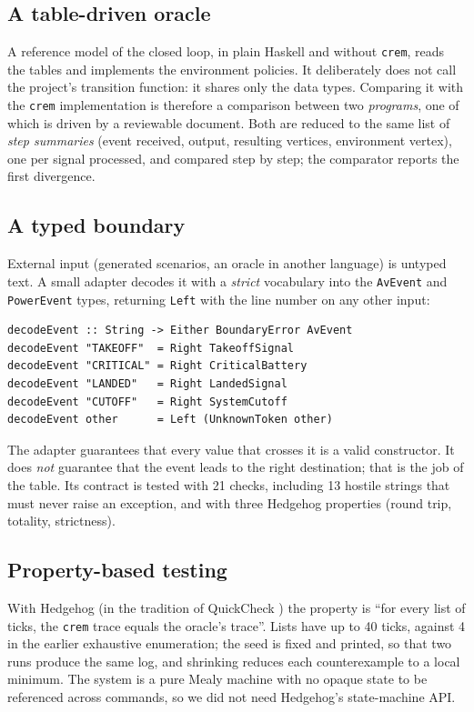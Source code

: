 \documentclass[review]{jfp-epi}
\newcommand{\crem}{\texttt{crem}}
\newcommand{\code}[1]{\texttt{#1}}
\begin{document}
\subsection{A table-driven oracle}

A reference model of the closed loop, in plain Haskell and without \crem{}, reads the tables and implements the environment policies. It deliberately does not call the project's transition function: it shares only the data types. Comparing it with the \crem{} implementation is therefore a comparison between two \emph{programs}, one of which is driven by a reviewable document. Both are reduced to the same list of \emph{step summaries} (event received, output, resulting vertices, environment vertex), one per signal processed, and compared step by step; the comparator reports the first divergence.

\subsection{A typed boundary}

External input (generated scenarios, an oracle in another language) is untyped text. A small adapter decodes it with a \emph{strict} vocabulary into the \code{AvEvent} and \code{PowerEvent} types, returning \code{Left} with the line number on any other input:

\begin{lstlisting}[caption={The typed boundary (core).},label={lst:boundary}]
decodeEvent :: String -> Either BoundaryError AvEvent
decodeEvent "TAKEOFF"  = Right TakeoffSignal
decodeEvent "CRITICAL" = Right CriticalBattery
decodeEvent "LANDED"   = Right LandedSignal
decodeEvent "CUTOFF"   = Right SystemCutoff
decodeEvent other      = Left (UnknownToken other)
\end{lstlisting}

The adapter guarantees that every value that crosses it is a valid constructor. It does \emph{not} guarantee that the event leads to the right destination; that is the job of the table. Its contract is tested with 21 checks, including 13 hostile strings that must never raise an exception, and with three Hedgehog properties (round trip, totality, strictness).

\subsection{Property-based testing}

With Hedgehog \cite{hedgehog} (in the tradition of QuickCheck \cite{claessen2000quickcheck}) the property is ``for every list of ticks, the \crem{} trace equals the oracle's trace''. Lists have up to 40 ticks, against 4 in the earlier exhaustive enumeration; the seed is fixed and printed, so that two runs produce the same log, and shrinking reduces each counterexample to a local minimum. The system is a pure Mealy machine with no opaque state to be referenced across commands, so we did not need Hedgehog's state-machine API.
\end{document}
